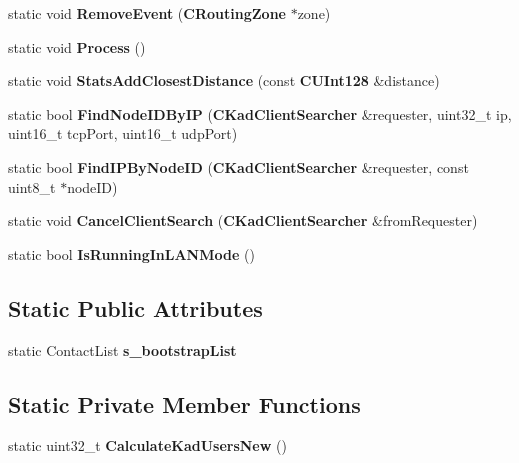 \begin{DoxyCompactItemize}
\item 
static void {\bfseries RemoveEvent} ({\bf CRoutingZone} $\ast$zone)\label{classKademlia_1_1CKademlia_a1212a44976e873d38915c8000f8f4a0a}

\item 
static void {\bfseries Process} ()\label{classKademlia_1_1CKademlia_ad54e21b064b974488ae1e05893bb3c4c}

\item 
static void {\bfseries StatsAddClosestDistance} (const {\bf CUInt128} \&distance)\label{classKademlia_1_1CKademlia_a1c15d350b02bdfb553ce26cd4a3b7ab9}

\item 
static bool {\bfseries FindNodeIDByIP} ({\bf CKadClientSearcher} \&requester, uint32\_\-t ip, uint16\_\-t tcpPort, uint16\_\-t udpPort)\label{classKademlia_1_1CKademlia_a872a86c78ebda09e58a67b5081609db9}

\item 
static bool {\bfseries FindIPByNodeID} ({\bf CKadClientSearcher} \&requester, const uint8\_\-t $\ast$nodeID)\label{classKademlia_1_1CKademlia_add0909037800a14a6a27a8982d8ff200}

\item 
static void {\bfseries CancelClientSearch} ({\bf CKadClientSearcher} \&fromRequester)\label{classKademlia_1_1CKademlia_ad7e0f7abf2e28a09ece258aac3e0f2f4}

\item 
static bool {\bfseries IsRunningInLANMode} ()\label{classKademlia_1_1CKademlia_a4b82c4efa322b547d29163ff9233f49f}

\end{DoxyCompactItemize}
\subsection*{Static Public Attributes}
\begin{DoxyCompactItemize}
\item 
static ContactList {\bfseries s\_\-bootstrapList}\label{classKademlia_1_1CKademlia_ad7c84f07d061d49309a0d04bf9cc2652}

\end{DoxyCompactItemize}
\subsection*{Static Private Member Functions}
\begin{DoxyCompactItemize}
\item 
static uint32\_\-t {\bfseries CalculateKadUsersNew} ()\label{classKademlia_1_1CKademlia_a0f5427ec731cfaf6e9a6f43a7a7d277c}

\end{DoxyCompactItemize}
